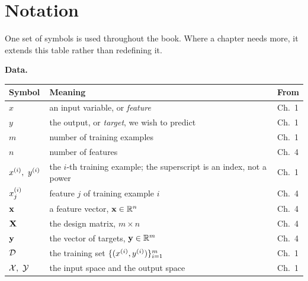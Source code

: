
\chapter*{Notation}

One set of symbols is used throughout the book. Where a chapter needs more, it
extends this table rather than redefining it.

\vspace{4pt}
\noindent\textbf{Data.}
\begin{center}
\small
\renewcommand{\arraystretch}{1.25}
\begin{tabular}{@{}L{2.6cm}L{7.4cm}L{1.6cm}@{}}
\toprule
\textbf{Symbol} & \textbf{Meaning} & \textbf{From}\\
\midrule
$x$                 & an input variable, or \emph{feature} & Ch.\ 1\\
$y$                 & the output, or \emph{target}, we wish to predict & Ch.\ 1\\
$m$                 & number of training examples & Ch.\ 1\\
$n$                 & number of features & Ch.\ 4\\
$x^{(i)},\ y^{(i)}$ & the $i$-th training example; the superscript is an index, not a power & Ch.\ 1\\
$x^{(i)}_{j}$        & feature $j$ of training example $i$ & Ch.\ 4\\
$\mathbf{x}$               & a feature vector, $\mathbf{x}\in\mathbb{R}^{n}$ & Ch.\ 4\\
$\mathbf{X}$             & the design matrix, $m\times n$ & Ch.\ 4\\
$\mathbf{y}$               & the vector of targets, $\mathbf{y}\in\mathbb{R}^{m}$ & Ch.\ 4\\
$\mathcal{D}$             & the training set $\{(x^{(i)},y^{(i)})\}_{i=1}^{m}$ & Ch.\ 1\\
$\mathcal{X},\ \mathcal{Y}$ & the input space and the output space & Ch.\ 1\\
\bottomrule
\end{tabular}
\end{center}

